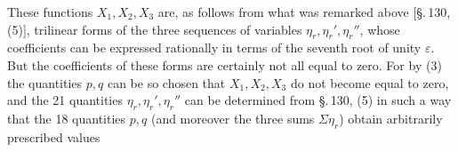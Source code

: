 
These functions $X_1, X_2, X_3$ are, as follows from what was remarked above [§.\,130, (5)], trilinear forms of the three sequences of variables $\eta_r, \eta_r', \eta_r''$, whose coefficients can be expressed rationally in terms of the seventh root of unity $\varepsilon$. But the coefficients of these forms are certainly not all equal to zero. For by (3) the quantities $p, q$ can be so chosen that $X_1, X_2, X_3$ do not become equal to zero, and the 21 quantities $\eta_r, \eta_r', \eta_r''$ can be determined from §.\,130, (5) in such a way that the 18 quantities $p, q$ (and moreover the three sums $\Sigma \eta_r$) obtain arbitrarily prescribed values
